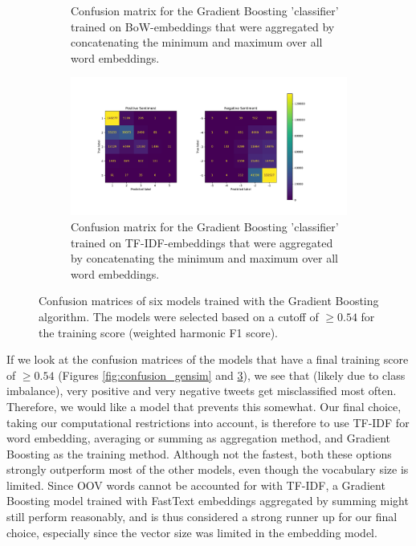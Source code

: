 \begin{figure}
\begin{subfigure}[b]{0.475\textwidth}
        \caption{Confusion matrix for the Gradient Boosting 'classifier' trained on BoW-embeddings that were aggregated by concatenating the minimum and maximum over all word embeddings.}    
        \label{fig:grad_boost_mm_bow}
    \end{subfigure}
    \hfill
    \begin{subfigure}[b]{0.475\textwidth}
        \centering
        \includegraphics[width=\textwidth]{images/grad_boost_mm_tfidf.pdf}
        \caption{Confusion matrix for the Gradient Boosting 'classifier' trained on TF-IDF-embeddings that were aggregated by concatenating the minimum and maximum over all word embeddings.}
        \label{fig:grad_boost_mm_tfidf}
    \end{subfigure}
    \caption{Confusion matrices of six models trained with the Gradient Boosting algorithm. The models were selected based on a cutoff of $\ge 0.54$ for the training score (weighted harmonic F1 score).} 
    \label{fig:confusion_sklearn}
\end{figure}

If we look at the confusion matrices of the models that have a final training score of $\ge 0.54$ (Figures \ref{fig:confusion_gensim} and \ref{fig:confusion_sklearn}), we see that (likely due to class imbalance), very positive and very negative tweets get misclassified most often. Therefore, we would like a model that prevents this somewhat.
Our final choice, taking our computational restrictions into account, is therefore to use TF-IDF for word embedding, averaging or summing as aggregation method, and Gradient Boosting as the training method. Although not the fastest, both these options strongly outperform most of the other models, even though the vocabulary size is limited.
Since OOV words cannot be accounted for with TF-IDF, a Gradient Boosting model trained with FastText embeddings aggregated by summing might still perform reasonably, and is thus considered a strong runner up for our final choice, especially since the vector size was limited in the embedding model.

